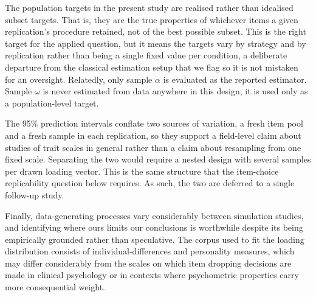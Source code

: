 \documentclass[
  nonatbib,
  authoryear,
  preprint]{elsarticle}
\begin{document}
The population targets in the present study are realised rather than
idealised subset targets. That is, they are the true properties of
whichever items a given replication's procedure retained, not of the
best possible subset. This is the right target for the applied question,
but it means the targets vary by strategy and by replication rather than
being a single fixed value per condition, a deliberate departure from
the classical estimation setup that we flag so it is not mistaken for an
oversight. Relatedly, only sample \(\alpha\) is evaluated as the
reported estimator. Sample \(\omega\) is never estimated from data
anywhere in this design, it is used only as a population-level target.

The 95\% prediction intervals conflate two sources of variation, a fresh
item pool and a fresh sample in each replication, so they support a
field-level claim about studies of trait scales in general rather than a
claim about resampling from one fixed scale. Separating the two would
require a nested design with several samples per drawn loading vector.
This is the same structure that the item-choice replicability question
below requires. As such, the two are deferred to a single follow-up
study.

Finally, data-generating processes vary considerably between simulation
studies, and identifying where ours limits our conclusions is worthwhile
despite its being empirically grounded rather than speculative. The
corpus used to fit the loading distribution consists of
individual-differences and personality measures, which may differ
considerably from the scales on which item dropping decisions are made
in clinical psychology or in contexts where psychometric properties
carry more consequential weight.
\end{document}

